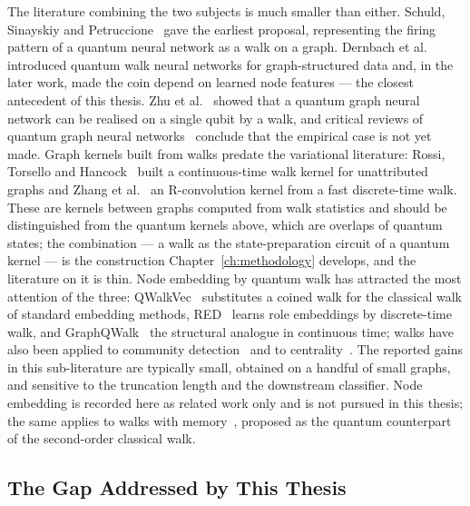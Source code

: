 The literature combining the two subjects is much smaller than either.
Schuld, Sinayskiy and Petruccione~\cite{Schuld_2014} gave the earliest
proposal, representing the firing pattern of a quantum neural network as a
walk on a graph. Dernbach et al.~\cite{Dernbach_2018, Dernbach_2019}
introduced quantum walk neural networks for graph-structured data and, in the
later work, made the coin depend on learned node features --- the closest
antecedent of this thesis. Zhu et al.~\cite{Zhu_2026} showed that a quantum
graph neural network can be realised on a single qubit by a walk, and
critical reviews of quantum graph neural networks~\cite{Ceschini_2026,
innan2026embeddingsshapegraphneural} conclude that the empirical case is not
yet made. Graph kernels built from walks predate the variational literature:
Rossi, Torsello and Hancock~\cite{Rossi_2013} built a continuous-time walk
kernel for unattributed graphs and Zhang et al.~\cite{Zhang_2022} an
R-convolution kernel from a fast discrete-time walk. These are kernels
between graphs computed from walk statistics and should be distinguished from
the quantum kernels above, which are overlaps of quantum states; the
combination --- a walk as the state-preparation circuit of a quantum kernel
--- is the construction Chapter~\ref{ch:methodology} develops, and the
literature on it is thin. Node embedding by quantum walk has attracted the
most attention of the three: QWalkVec~\cite{10.1007/978-981-97-2242-6_8}
substitutes a coined walk for the classical walk of standard embedding
methods, RED~\cite{Wang_2021} learns role embeddings by discrete-time walk,
and GraphQWalk~\cite{Liu_2026} the structural analogue in continuous time;
walks have also been applied to community detection~\cite{Mukai_2020,
He_2025} and to centrality~\cite{Wang_2025, Berry_2010}. The reported gains
in this sub-literature are typically small, obtained on a handful of small
graphs, and sensitive to the truncation length and the downstream
classifier. Node embedding is recorded here as related work only and is not
pursued in this thesis; the same applies to walks with
memory~\cite{Flitney_2003, McGettrick_2009, Shakeel_2019,
PhysRevA.106.062215}, proposed as the quantum counterpart of the
second-order classical walk.

\subsection{The Gap Addressed by This Thesis}
\label{sec:lr-gap}

